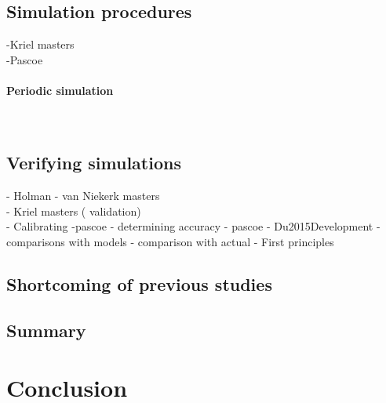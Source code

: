 	\subsection{Simulation procedures}
		-Kriel masters\\
		-Pascoe\\
		\paragraph{Periodic simulation}\leavevmode\\
 	\subsection{Verifying simulations}
 		- Holman
 		- van Niekerk masters\\
 		- Kriel masters ( validation)\\
 		- Calibrating -pascoe
 		- determining accuracy - pascoe
 		- Du2015Development
 		- comparisons with models
 		- comparison with actual 
 		- First principles
 	\subsection{Shortcoming of previous studies}
 	\label{Shortcomings of previous work}
	\subsection{Summary}
\section{Conclusion}